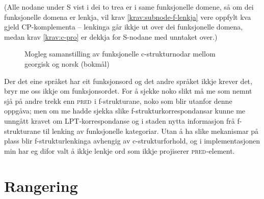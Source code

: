\documentclass[12pt,a4paper,oneside,draft]{report}
\newcommand{\F}[2]{\textsc{#1}\ensuremath{_{#2}}}
\newcommand{\PRED}{\F{pred}{}}
\begin{document}
(Alle nodane under S vist i dei to trea er i same funksjonelle domene,
 så om dei funksjonelle domena er lenkja, vil krav
 \ref{krav:subnode-f-lenkja} vere oppfylt kva gjeld CP-komplementa --
 lenkinga går ikkje ut over dei funksjonelle domena, medan krav
 \ref{krav:c-pro} er dekkja for S-nodane med unntaket over.)

  \begin{figure}[htp]
   \centering
  
  \caption{Mogleg samanstilling av funksjonelle c\hyp{}strukturnodar mellom georgisk og norsk (bokmål)}
   \label{fig:fnord}
  \end{figure}

Der det eine språket har eit funksjonsord og det andre språket ikkje
 krever det, bryr me oss ikkje om funksjonsordet. For å sjekke noko
 slikt må me som nemnt sjå på andre trekk enn \PRED{} i f\hyp{}strukturane,
 noko som blir utanfor denne oppgåva; men om me hadde sjekka slike
 f\hyp{}strukturkorrespondansar kunne me unngått kravet om
 LPT\hyp{}korrespondanse og i staden nytta informasjon frå f\hyp{}strukturane
 til lenking av funksjonelle kategoriar. Utan å ha slike mekanismar
 på plass blir f\hyp{}strukturlenkinga avhengig av c\hyp{}strukturforhold, og i
 implementasjonen min har eg difor valt å ikkje lenkje ord som ikkje
 projiserer \PRED{}-element.

\section{Rangering}
\label{sec-3.8}

   \label{SEC:rangering}
\end{document}
